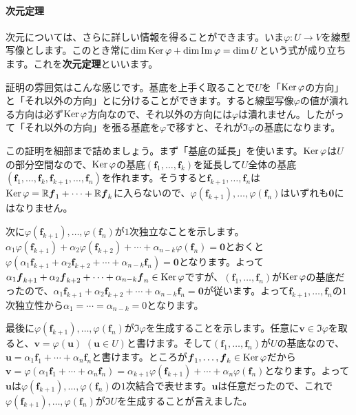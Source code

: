 \paragraph{次元定理} \label{paragraph:dimension_theorem}

次元については、さらに詳しい情報を得ることができます。いま$\varphi\colon U\rightarrow V$を線型写像とします。このとき常に$\dim \operatorname{Ker} \varphi + \dim \mathrm{Im}\, \varphi = \dim U$という式が成り立ちます。これを\textbf{次元定理}といいます。

証明の雰囲気はこんな感じです。基底を上手く取ることで$U$を「$\operatorname{Ker} \varphi$の方向」と「それ以外の方向」とに分けることができます。すると線型写像$\varphi$の値が潰れる方向は必ず$\operatorname{Ker} \varphi$方向なので、それ以外の方向には$\varphi$は潰れません。したがって「それ以外の方向」を張る基底を$\varphi$で移すと、それが$\Im \varphi$の基底になります。

この証明を細部まで詰めましょう。まず「基底の延長」を使います。$\operatorname{Ker} \varphi$は$U$の部分空間なので、$\operatorname{Ker}\varphi$の基底$(\bm{f}_1, \ldots, \bm{f}_k)$を延長して$U$全体の基底$(\bm{f}_1, \ldots, \bm{f}_k, \bm{f}_{k + 1}, \ldots, \bm{f}_n)$を作れます。そうすると$\bm{f}_{k + 1}, \ldots, \bm{f}_n$は$\operatorname{Ker} \varphi = \mathbb{R}\boldsymbol{f}_1 + \cdots + \mathbb{R}\boldsymbol{f}_k$に入らないので、$\varphi(\bm{f}_{k + 1}), \ldots, \varphi(\bm{f}_n)$はいずれも$\bm{0}$にはなりません。

次に$\varphi(\bm{f}_{k + 1}), \ldots, \varphi(\bm{f}_n)$が$1$次独立なことを示します。$\alpha_1 \varphi(\bm{f}_{k + 1}) + \alpha_2 \varphi(\bm{f}_{k + 2}) + \cdots + \alpha_{n - k}\varphi(\bm{f}_n) = \bm{0}$とおくと$\varphi(\alpha_1 \bm{f}_{k + 1} + \alpha_2 \bm{f}_{k + 2} + \cdots + \alpha_{n - k}\bm{f}_{n}) = \bm{0}$となります。よって$\alpha_1 \boldsymbol{f}_{k + 1} + \alpha_2 \boldsymbol{f}_{k + 2} + \cdots + \alpha_{n - k}\boldsymbol{f}_{n} \in \operatorname{Ker}\varphi$ですが、$(\bm{f}_1, \ldots, \bm{f}_n)$が$\operatorname{Ker}\varphi$の基底だったので、$\alpha_1 \bm{f}_{k + 1} + \alpha_2 \bm{f}_{k + 2} + \cdots + \alpha_{n - k}\bm{f}_{n} = \bm{0}$が従います。よって$\bm{f}_{k + 1}, \ldots, \bm{f}_{n}$の$1$次独立性から$\alpha_1 = \cdots = \alpha_{n - k} = 0$となります。

最後に$\varphi(\bm{f}_{k + 1}), \ldots, \varphi(\bm{f}_n)$が$\Im \varphi$を生成することを示します。任意に$\bm{v}\in \Im \varphi$を取ると、$\bm{v} = \varphi(\bm{u})$ $(\bm{u} \in U)$と書けます。そして$(\bm{f}_1, \ldots, \bm{f}_n)$が$U$の基底なので、$\bm{u} = \alpha_1 \bm{f}_1 + \cdots + \alpha_n \bm{f}_n$と書けます。ところが$\boldsymbol{f}_1, \ldots, \boldsymbol{f}_k \in \operatorname{Ker}\varphi$だから$\bm{v} = \varphi(\alpha_1 \bm{f}_1 + \cdots + \alpha_n \bm{f}_n) = \alpha_{k + 1} \varphi(\bm{f}_{k + 1}) + \cdots + \alpha_n \varphi(\bm{f}_n)$となります。よって$\bm{u}$は$\varphi(\bm{f}_{k + 1}), \ldots, \varphi(\bm{f}_n)$の$1$次結合で表せます。$\bm{u}$は任意だったので、これで$\varphi(\bm{f}_{k + 1}), \ldots, \varphi(\bm{f}_n)$が$\Im U$を生成することが言えました。

